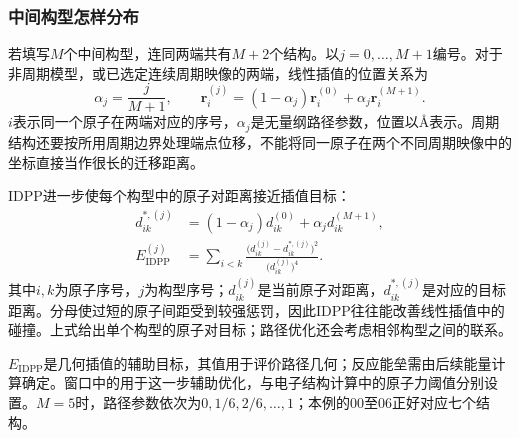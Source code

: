 \subsubsection{中间构型怎样分布}

若填写$M$个中间构型，连同两端共有$M+2$个结构。以$j=0,\ldots,M+1$编号。对于非周期模型，或已选定连续周期映像的两端，线性插值的位置关系为
\begin{equation}
  \alpha_j=\frac{j}{M+1},\qquad
  \mathbf r_i^{(j)}=(1-\alpha_j)\mathbf r_i^{(0)}
     +\alpha_j\mathbf r_i^{(M+1)}.
  \label{eq:neb-image-interpolation}
\end{equation}
$i$表示同一个原子在两端对应的序号，$\alpha_j$是无量纲路径参数，位置以\AA 表示。周期结构还要按所用周期边界处理端点位移，不能将同一原子在两个不同周期映像中的坐标直接当作很长的迁移距离。

IDPP进一步使每个构型中的原子对距离接近插值目标：
\begin{equation}
\begin{aligned}
  d_{ik}^{*,(j)}&=(1-\alpha_j)d_{ik}^{(0)}
                      +\alpha_j d_{ik}^{(M+1)},\\
  E_{\mathrm{IDPP}}^{(j)}&=
    \sum_{i<k}\frac{\bigl(d_{ik}^{(j)}-d_{ik}^{*,(j)}\bigr)^2}
                         {\bigl(d_{ik}^{(j)}\bigr)^4}.
\end{aligned}
\label{eq:idpp-pair-objective}
\end{equation}
其中$i,k$为原子序号，$j$为构型序号；$d_{ik}^{(j)}$是当前原子对距离，$d_{ik}^{*,(j)}$是对应的目标距离。分母使过短的原子间距受到较强惩罚，因此IDPP往往能改善线性插值中的碰撞。上式给出单个构型的原子对目标；路径优化还会考虑相邻构型之间的联系。

$E_{\mathrm{IDPP}}$是几何插值的辅助目标，其值用于评价路径几何；反应能垒需由后续能量计算确定。窗口中的用于这一步辅助优化，与电子结构计算中的原子力阈值分别设置。$M=5$时，路径参数依次为$0,1/6,2/6,\ldots,1$；本例的00至06正好对应七个结构。
